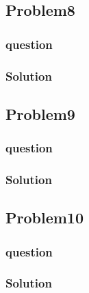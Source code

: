 \documentclass[journal,12pt,twocolumn]{IEEEtran}
\begin{document}
\subsection{Problem8}
\subsubsection{question}

\subsubsection{Solution}


\subsection{Problem9}
\subsubsection{question}

\subsubsection{Solution}


\subsection{Problem10}
\subsubsection{question}

\subsubsection{Solution}

\end{document}
